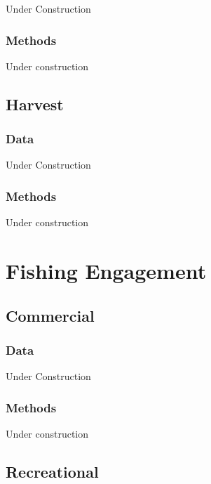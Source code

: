 \documentclass[
]{book}
\begin{document}
Under Construction

\hypertarget{methods-17}{%
\subsection{Methods}\label{methods-17}}

Under construction

\hypertarget{harvest}{%
\section{Harvest}\label{harvest}}

\hypertarget{data-18}{%
\subsection{Data}\label{data-18}}

Under Construction

\hypertarget{methods-18}{%
\subsection{Methods}\label{methods-18}}

Under construction

\hypertarget{fishing-engagement}{%
\chapter{Fishing Engagement}\label{fishing-engagement}}

\hypertarget{commercial}{%
\section{Commercial}\label{commercial}}

\hypertarget{data-19}{%
\subsection{Data}\label{data-19}}

Under Construction

\hypertarget{methods-19}{%
\subsection{Methods}\label{methods-19}}

Under construction

\hypertarget{recreational}{%
\section{Recreational}\label{recreational}}
\end{document}
